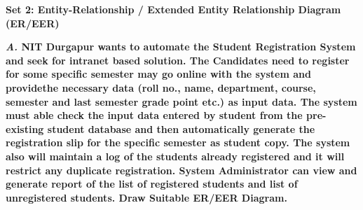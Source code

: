 \documentclass[12pt, letterpaper, twoside]{book}
\begin{document}
\begin{center}
\end{center}
\begin{large}
\pagebreak
\textbf{Set 2: Entity-Relationship / Extended Entity Relationship Diagram (ER/EER)}
\end{large}
\begin{flushleft}
\textbf{\emph{A.} NIT Durgapur wants to automate the Student Registration System and seek for intranet based solution. The Candidates  need  to  register  for  some  specific  semester  may  go  online  with  the  system  and  providethe necessary data (roll no., name, department, course, semester and last semester grade point etc.) as input data. The system must able check the input data entered by student from the pre-existing student database and then automatically generate the registration slip for the specific semester as student copy. The system also  will  maintain  a  log  of  the  students  already  registered  and  it  will  restrict  any  duplicate  registration. System Administrator can view and generate report of the list of registered students and list of unregistered students. Draw Suitable ER/EER Diagram.\\}
\end{flushleft}
\end{document}
